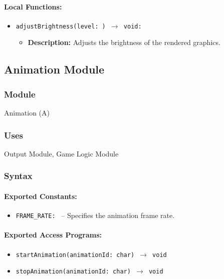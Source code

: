 \documentclass[12pt, titlepage]{article}
\begin{document}
\paragraph{Local Functions:}
\begin{itemize}
    \item \texttt{adjustBrightness(level: ) $\to$ void:}
    \begin{itemize}
        \item \textbf{Description:} Adjusts the brightness of the rendered graphics.
    \end{itemize}
\end{itemize}

\newpage

\subsection{Animation Module}

\subsubsection{Module}
Animation (A)

\subsubsection{Uses}
Output Module, Game Logic Module

\subsubsection{Syntax}

\paragraph{Exported Constants:}
\begin{itemize}
    \item \texttt{FRAME\_RATE: } -- Specifies the animation frame rate.
\end{itemize}

\paragraph{Exported Access Programs:}
\begin{itemize}
    \item \texttt{startAnimation(animationId: char) $\to$ void}
    \item \texttt{stopAnimation(animationId: char) $\to$ void}
\end{itemize}
\end{document}
